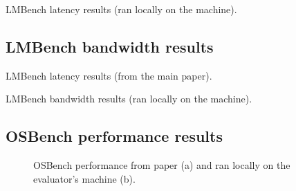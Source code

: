 \begin{table}[!h]
  \caption{LMBench latency results (ran locally on the machine).}
  \begin{center}
  \resizebox{0.5\columnwidth}{!}{%
  
  }
\end{center}
\label{tab:lmbench-performance-local}
\end{table}

\newpage
\subsection{LMBench bandwidth results}

\begin{table}[!h]
  \caption{LMBench latency results (from the main paper).}
  \begin{center}
  \resizebox{0.5\columnwidth}{!}{%
  
  }
\end{center}
\label{tab:lmbench-bandwidth-paper}
\end{table}

\begin{table}[!h]
  \caption{LMBench bandwidth results (ran locally on the machine).}
  \begin{center}
  \resizebox{0.5\columnwidth}{!}{%
  
  }
\end{center}
\label{tab:lmbench-bandwidth-local}
\end{table}

\newpage
\subsection{OSBench performance results}
\begin{figure}[!h]
  \hfill
  \hfill
  \hfill
  \centering
  \caption{OSBench performance from paper (a) and ran locally on the evaluator's machine (b).}
  \label{fig:phoronixosbench}
  \end{figure}
\newpage

